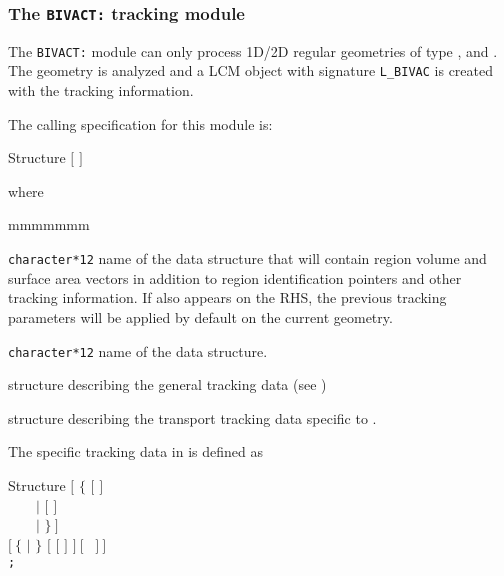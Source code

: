 \subsubsection{The {\tt BIVACT:} tracking module}\label{sect:BIVACData}

The {\tt BIVACT:} module can only process 1D/2D regular geometries
of type ,  and . The geometry is analyzed and
a LCM object with signature {\tt L\_BIVAC} is created with the tracking information.

\vskip 0.2cm

The calling specification for this module is:

\begin{DataStructure}{Structure }
\moc{:=}  $[$  $]$ 
 \moc{::}   
\end{DataStructure}

\noindent  where
\begin{ListeDeDescription}{mmmmmmm}

\item[\dusa{TRKNAM}] {\tt character*12} name of the  data
structure that will contain region volume and surface area vectors in
addition to region identification pointers and other tracking information.
If  also appears on the RHS, the previous tracking 
parameters will be applied by default on the current geometry.

\item[\dusa{GEONAM}] {\tt character*12} name of the  data
structure.

\item[\dstr{desctrack}] structure describing the general tracking data (see
)

\item[\dstr{descbivac}] structure describing the transport tracking data
specific to .

\end{ListeDeDescription}

\vskip 0.2cm

The  specific tracking data in  is defined as

\begin{DataStructure}{Structure }
$[$ $\{$  $[$   $]$ \\
~~~~$|$  $[$   $]$ \\
~~~~$|$  $\}~]$ \\
$[~\{$  $|$  $\}$  $[$  $[$  $]$  $]~[$  ~$]~]$ \\
{\tt ;}
\end{DataStructure}

